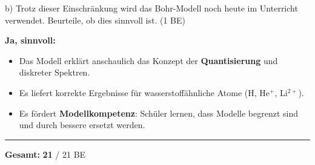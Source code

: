 \documentclass[11pt,a4paper]{article}
\begin{document}
b) Trotz dieser Einschränkung wird das Bohr-Modell noch heute im Unterricht verwendet. Beurteile, ob dies sinnvoll ist. (1 BE)

\begin{tcolorbox}[loesungbox]
\textbf{Ja, sinnvoll:}
\begin{itemize}[noitemsep,topsep=2pt]
\item Das Modell erklärt anschaulich das Konzept der \textbf{Quantisierung} und diskreter Spektren.
\item Es liefert korrekte Ergebnisse für wasserstoffähnliche Atome (H, He$^+$, Li$^{2+}$).
\item Es fördert \textbf{Modellkompetenz}: Schüler lernen, dass Modelle begrenzt sind und durch bessere ersetzt werden.
\end{itemize}
\end{tcolorbox}

\vfill

\begin{center}
\rule{10cm}{0.5pt}

\textbf{Gesamt:} \textcolor{loesung}{\textbf{21}} / 21 BE
\end{center}
\end{document}
